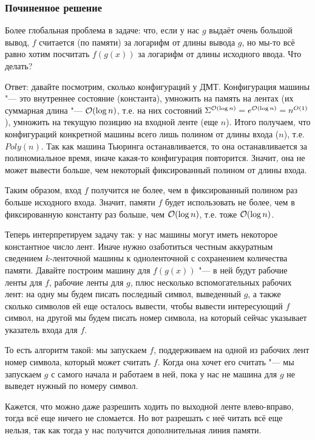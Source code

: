 	\subsubsection{Починенное решение}
	\begin{Rem}
		Более глобальная проблема в задаче: что, если у нас $g$ выдаёт очень большой вывод,
		$f$ считается (по памяти) за логарифм от длины вывода $g$, но мы-то всё равно хотим
		посчитать $f(g(x))$ за логарифм от длины исходного ввода.
		Что делать?

		Ответ: давайте посмотрим, сколько конфигураций у ДМТ.
		Конфигурация машины "--- это внутреннее состояние (константа),
		умножить на память на лентах (их суммарная длина "--- $\mathcal O(\log n)$, т.е. на них
		состояний $\Sigma^{\mathcal O(\log n)} = e^{\mathcal O(\log n)} = n^{O(1)}$),
		умножить на текущую позицию на входной ленте (еще $n$).
		Итого получаем, что конфигураций конкретной машины всего лишь полином от длины входа ($n$),
		т.е. $Poly(n)$.
		Так как машина Тьюринга останавливается, то она останавливается за полиномиальное время,
		иначе какая-то конфигурация повторится.
		Значит, она не может вывести больше, чем некоторый фиксированный полином от длины входа.

		Таким образом, вход $f$ получится не более, чем в фиксированный полином раз больше исходного входа.
		Значит, памяти $f$ будет использовать не более, чем в фиксированную константу раз больше,
		чем $\mathcal O(\log n)$, т.е. тоже $\mathcal O(\log n)$.
	\end{Rem}

	Теперь интерпретируем задачу так: у нас машины могут иметь некоторое константное число лент.
	Иначе нужно озаботиться честным аккуратным сведением $k$-ленточной машины к одноленточной с сохранением количества памяти.
	Давайте построим машину для $f(g(x))$ "--- в ней будут рабочие ленты для $f$, рабочие ленты для $g$,
	плюс несколько вспомогательных рабочих лент: на одну мы будем писать последный символ, выведенный
	$g$, а также сколько символов ей еще осталось вывести, чтобы вывести интересующий $f$ символ,
	на другой мы будем писать номер символа, на который сейчас указывает указатель входа для $f$.

	То есть алгоритм такой: мы запускаем $f$, поддерживаем на одной из рабочих лент номер символа,
	который может считать $f$.
	Когда она хочет его считать "--- мы запускаем $g$ с самого начала и работаем в ней, пока у нас не
	машина для $g$ не выведет нужный по номеру символ.

	\begin{Rem}
		Кажется, что можно даже разрешить ходить по выходной ленте влево-вправо, тогда
		всё еще ничего не сломается.
		Но вот разрешать с неё читать всё еще нельзя, так как тогда у нас получится дополнительная линия памяти.
	\end{Rem}


